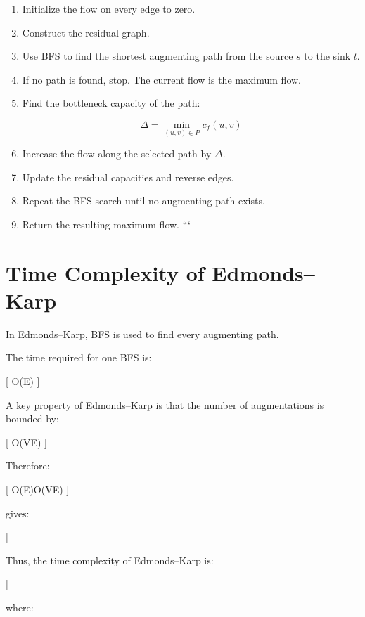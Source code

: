 \documentclass[12pt,a4paper]{article}
\begin{document}
\begin{enumerate}[label=\textbf{Step \arabic\*:}]

```
\item Initialize the flow on every edge to zero.

\item Construct the residual graph.

\item Use BFS to find the shortest augmenting path from the source
$s$ to the sink $t$.

\item If no path is found, stop. The current flow is the maximum
flow.

\item Find the bottleneck capacity of the path:

\[
\Delta =
\min_{(u,v)\in P} c_f(u,v)
\]

\item Increase the flow along the selected path by $\Delta$.

\item Update the residual capacities and reverse edges.

\item Repeat the BFS search until no augmenting path exists.

\item Return the resulting maximum flow.
```

\end{enumerate}

\section{Time Complexity of Edmonds--Karp}

In Edmonds--Karp, BFS is used to find every augmenting path.

The time required for one BFS is:

[
O(E)
]

A key property of Edmonds--Karp is that the number of augmentations is
bounded by:

[
O(VE)
]

Therefore:

[
O(E)\times O(VE)
]

gives:

[
]

Thus, the time complexity of Edmonds--Karp is:

[
]

where:
\end{document}
